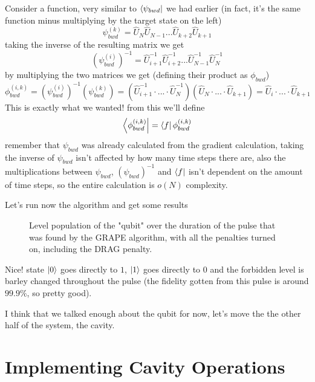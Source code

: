 Consider a function, very similar to  $\bra{\psi_{bwd}}$ we had earlier (in fact, it's the same function minus multiplying by the target state on the left)
\[
    \psi_{bwd}^{ (k)} = \hat{U}_N\hat{U}_{N-1}...\hat{U}_{k+2}\hat{U}_{k+1}
\]
taking the inverse of the resulting matrix we get
\[
    (\psi_{bwd}^{ (i)})^{-1} = \hat{U}_{i+1}^{-1}\hat{U}_{i+2}^{-1}...\hat{U}_{N-1}^{-1}\hat{U}_{N}^{-1}
\]
by multiplying the two matrices we get (defining their product as $\phi_{bwd}$)
\[
    \phi_{bwd}^{ (i,k)} = (\psi_{bwd}^{ (i)})^{-1} (\psi_{bwd}^{ (k)}) = (\hat{U}_{i+1}^{-1}\cdot...\cdot \hat{U}_{N}^{-1}) (\hat{U}_N\cdot...\cdot \hat{U}_{k+1}) = \hat{U}_{i}\cdot...\cdot \hat{U}_{k+1}
\]
This is exactly what we wanted! from this we'll define
\[
    \bra{\phi_{bwd}^{ (i,k)}} = \bra{f}\phi_{bwd}^{ (i,k)}
\]
remember that $\psi_{bwd}$ was already calculated from the gradient calculation, taking the inverse of $\psi_{bwd}$ isn't affected by how many time steps there are, also the multiplications between $\psi_{bwd}$, $ (\psi_{bwd})^{-1}$ and $\bra{f}$ isn't dependent on the amount of time steps, so the entire calculation is $o (N)$ complexity.

Let's run now the algorithm and get some results
\begin{figure}[H]
    \begin{center}
        
    \end{center}
    \caption{Level population of the "qubit" over the duration of the pulse that was found by the GRAPE algorithm, with all the penalties turned on, including the DRAG penalty.}
    \label{fig:sDRAG-results}
\end{figure}
Nice! state $\ket{0}$ goes directly to $1$, $\ket{1}$ goes directly to $0$ and the forbidden level is barley changed throughout the pulse (the fidelity gotten from this pulse is around $99.9\%$, so pretty good).

I think that we talked enough about the qubit for now, let's move the the other half of the system, the cavity.

\section{Implementing Cavity Operations}
